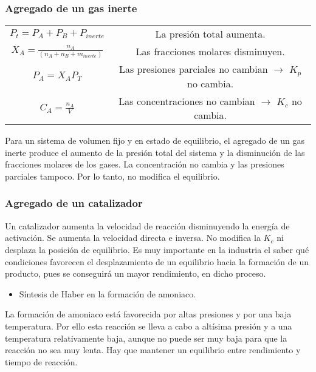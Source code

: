         \subsubsection{Agregado de un gas inerte}
            \begin{center}
                \begin{tabular}{cc}
                    \multicolumn{1}{c}{$P_t = P_A + P_B + P_{inerte}$} & \multicolumn{1}{m{4cm}}{La presión total aumenta.} \\[10pt]
                    \multicolumn{1}{c}{$X_A = \frac{n_A}{(n_A + n_B + m_{inerte})}$} & \multicolumn{1}{m{4cm}}{Las fracciones molares disminuyen.} \\[10pt]
                    \multicolumn{1}{c}{$P_A = X_A P_T$} & \multicolumn{1}{m{4cm}}{Las presiones parciales no cambian $\rightarrow$ $K_p$ no cambia.} \\[10pt]
                    \multicolumn{1}{c}{$C_A = \frac{n_A}{V}$} & \multicolumn{1}{m{4cm}}{Las concentraciones no cambian $\rightarrow$ $K_c$ no cambia.} \\
                \end{tabular}
            \end{center}
            \sangria{} Para un sistema de volumen fijo y en estado de equilibrio, el agregado de un gas inerte produce el aumento de la presión total del sistema y la disminución de las fracciones molares de los gases. La concentración no cambia y las presiones parciales tampoco. Por lo tanto, no modifica el equilibrio.
            \subsubsection{Agregado de un catalizador}
                \sangria{} Un catalizador aumenta la velocidad de reacción disminuyendo la energía de activación. Se aumenta la velocidad directa e inversa. No modifica la $K_c$ ni desplaza la posición de equilibrio.
                \sangria{} Es muy importante en la industria el saber qué condiciones favorecen el desplazamiento de un equilibrio hacia la formación de un producto, pues se conseguirá un mayor rendimiento, en dicho proceso. \\
                \begin{itemize} \item Síntesis de Haber en la formación de amoniaco. \end{itemize}  \sangria{} La formación de amoniaco está favorecida por altas presiones y por una baja temperatura. Por ello esta reacción se lleva a cabo a altísima presión y a una temperatura relativamente baja, aunque no puede ser muy baja para que la reacción no sea muy lenta. Hay que mantener un equilibrio entre rendimiento y tiempo de reacción.

